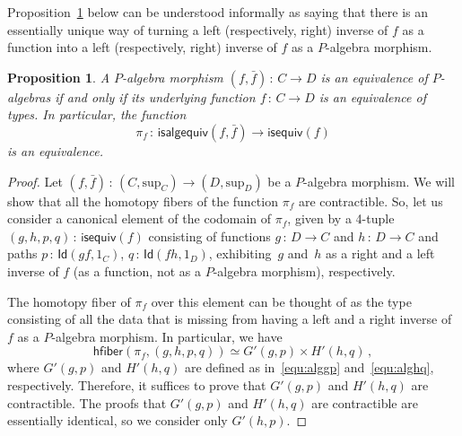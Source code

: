 \documentclass[10pt,a4paper,oneside,reqno]{amsart}
\numberwithin{equation}{section}
\theoremstyle{mythm}
\newtheorem{proposition}[theorem]{Proposition}
\theoremstyle{mydef}
\theoremstyle{myrmk}
\newcommand{\co}{\,{:}\,}
\newcommand{\hfiber}{\mathsf{hfiber}}
\newcommand{\Id}{\mathsf{Id}}
\renewcommand{\sup}{\mathrm{sup}}
\newcommand{\isalgequiv}{\mathsf{isalgequiv}}
\begin{document}
Proposition~\ref{WAlgSpace} below can be understood informally as saying that there is an essentially unique way of turning a left
(respectively, right) inverse of $f$ as a function into a left (respectively, right) inverse of $f$
as a $P$-algebra morphism.

\begin{proposition}\label{WAlgSpace} A $P$-algebra morphism $(f, \bar{f}) \co C \to D$ is an equivalence of
$P$-algebras if and only
if its underlying function $f \co C \to D$ is an equivalence of types. In particular, the function 
\[
\pi_f \co \isalgequiv(f, \bar{f})  \to \mathsf{isequiv}(f)  
\]
is an equivalence. 
\end{proposition}  




\begin{proof} Let $(f, \bar{f}) \co (C, \sup_C) \to (D, \sup_D)$ be a  $P$-algebra morphism. We will 
show that all the homotopy fibers of the function $\pi_f$ are contractible.
So, let us consider a canonical element of the codomain of $\pi_f$,  given by a 4-tuple $( g, h, p, q) \co \mathsf{isequiv}(f)$ consisting of functions $g \co D \to C$ and $h \co D \to C$ and paths $p \co \Id(gf, 1_C)$, $q \co \Id(fh, 1_D)$,
exhibiting~$g$ and~$h$ as a right and a left inverse of $f$ (as a function, not as a $P$-algebra morphism), respectively. 

The homotopy fiber of $\pi_f$ over this element can be thought of as the type consisting of all
the data that is missing from having a left and a right inverse of $f$ as a $P$-algebra morphism. 
In particular, we have
\begin{equation*}
\hfiber(\pi_f, (g, h, p, q ) ) \simeq G'(g,p) \times H'(h,q) \, ,
\end{equation*}
where $G'(g,p)$ and $H'(h,q)$ are defined as in~\eqref{equ:alggp} and~\eqref{equ:alghq}, respectively.
Therefore, it suffices to prove that $G'(g,p)$ and $H'(h,q)$ are  contractible.  The proofs that $G'(g,p)$ and $H'(h,q)$ are contractible are essentially identical, so we consider only $G'(h,p)$.


\end{proof}
\end{document}
